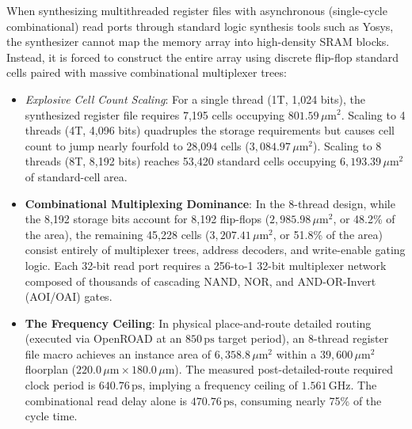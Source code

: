 When synthesizing multithreaded register files with asynchronous (single-cycle combinational) read ports through standard logic synthesis tools such as Yosys, the synthesizer cannot map the memory array into high-density SRAM blocks. Instead, it is forced to construct the entire array using discrete flip-flop standard cells paired with massive combinational multiplexer trees:
\begin{itemize}
    \item \textit{Explosive Cell Count Scaling}: For a single thread (1T, 1,024 bits), the synthesized register file requires 7,195 cells occupying $801.59\,\mu\text{m}^2$. Scaling to 4 threads (4T, 4,096 bits) quadruples the storage requirements but causes cell count to jump nearly fourfold to 28,094 cells ($3,084.97\,\mu\text{m}^2$). Scaling to 8 threads (8T, 8,192 bits) reaches 53,420 standard cells occupying $6,193.39\,\mu\text{m}^2$ of standard-cell area.
    
    \item \textbf{Combinational Multiplexing Dominance}: In the 8-thread design, while the 8,192 storage bits account for 8,192 flip-flops ($2,985.98\,\mu\text{m}^2$, or 48.2\% of the area), the remaining 45,228 cells ($3,207.41\,\mu\text{m}^2$, or 51.8\% of the area) consist entirely of multiplexer trees, address decoders, and write-enable gating logic. Each 32-bit read port requires a 256-to-1 32-bit multiplexer network composed of thousands of cascading NAND, NOR, and AND-OR-Invert (AOI/OAI) gates.
    
    \item \textbf{The Frequency Ceiling}: In physical place-and-route detailed routing (executed via OpenROAD at an $850\,\text{ps}$ target period), an 8-thread register file macro achieves an instance area of $6,358.8\,\mu\text{m}^2$ within a $39,600\,\mu\text{m}^2$ floorplan ($220.0\,\mu\text{m} \times 180.0\,\mu\text{m}$). The measured post-detailed-route required clock period is $640.76\,\text{ps}$, implying a frequency ceiling of $1.561\,\text{GHz}$. The combinational read delay alone is $470.76\,\text{ps}$, consuming nearly 75\% of the cycle time. 
\end{itemize}

